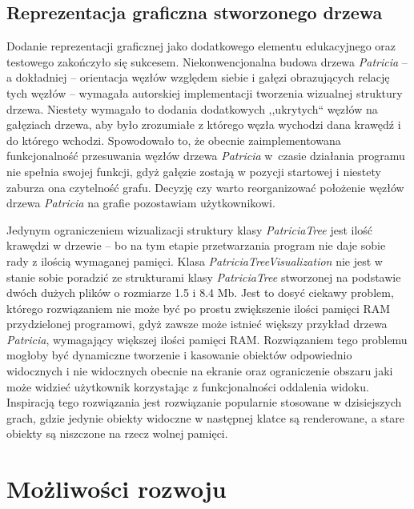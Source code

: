		\subsection{Reprezentacja graficzna stworzonego drzewa}\label{sec:czescPraktycznaRezultatyImplementacjiReprezentacja graficzna}
		
		Dodanie reprezentacji graficznej jako dodatkowego elementu edukacyjnego oraz testowego zakończyło się sukcesem. Niekonwencjonalna budowa drzewa \emph{Patricia} -- a dokładniej -- orientacja węzłów względem siebie i gałęzi obrazujących relację tych węzłów -- wymagała autorskiej implementacji tworzenia wizualnej struktury drzewa. Niestety wymagało to dodania dodatkowych ,,ukrytych`` węzłów na gałęziach drzewa, aby było zrozumiałe z którego węzła wychodzi dana krawędź i do którego wchodzi. Spowodowało to, że obecnie zaimplementowana funkcjonalność przesuwania węzłów drzewa \emph{Patricia} w~czasie działania programu nie spełnia swojej funkcji, gdyż gałęzie zostają w pozycji startowej i niestety zaburza ona czytelność grafu. Decyzję czy warto reorganizować położenie węzłów drzewa \emph{Patricia} na grafie pozostawiam użytkownikowi.
		
		Jedynym ograniczeniem wizualizacji struktury klasy \emph{PatriciaTree} jest ilość krawędzi w drzewie -- bo na tym etapie przetwarzania program nie daje sobie rady z ilością wymaganej pamięci. Klasa \emph{PatriciaTreeVisualization} nie jest w stanie sobie poradzić ze strukturami klasy \emph{PatriciaTree} stworzonej na podstawie dwóch dużych plików o rozmiarze 1.5 i 8.4 Mb. Jest to dosyć ciekawy problem, którego rozwiązaniem nie może być po prostu zwiększenie ilości pamięci RAM przydzielonej programowi, gdyż zawsze może istnieć większy przykład drzewa \emph{Patricia}, wymagający większej ilości pamięci RAM. Rozwiązaniem tego problemu mogłoby być dynamiczne tworzenie i kasowanie obiektów odpowiednio widocznych i nie widocznych obecnie na ekranie oraz ograniczenie obszaru jaki może widzieć użytkownik korzystając z funkcjonalności oddalenia widoku. Inspiracją tego rozwiązania jest rozwiązanie popularnie stosowane w dzisiejszych grach, gdzie jedynie obiekty widoczne w następnej klatce są renderowane, a stare obiekty są niszczone na rzecz wolnej pamięci.
		
	\section{Możliwości rozwoju}\label{sec:podsumowanieMozliwosciRozwoju}
	
